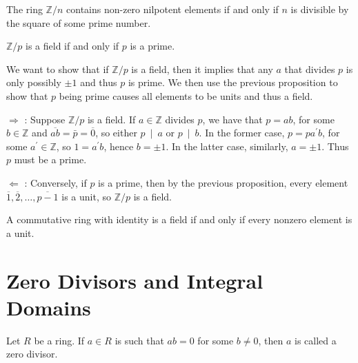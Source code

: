 \begin{lemma}
  The ring \(\mathbb{Z} / n\) contains non-zero nilpotent elements if and only if \(n\) is divisible by the square of some prime number.
\end{lemma}

\begin{corollary}
  \(\mathbb{Z} / p\) is a field if and only if \(p\) is a prime.
\end{corollary}

\begin{proofidea}
  
  We want to show that if \(\mathbb{Z}/p\) is a field, then it implies that any \(a\) that divides \(p\) is only possibly \(\pm 1\) and thus \(p\) is prime. We then use the previous proposition to show that \(p\) being prime causes all elements to be units and thus a field.

\end{proofidea}
  
\begin{formalproof}
  
\(\Rightarrow\) : Suppose \(\mathbb{Z} / p\) is a field. If \(a \in \mathbb{Z}\) divides \(p\), we have that \(p=a b\), for some \(b \in \mathbb{Z}\) and \(\overline{a b}=\bar{p}=\overline{0}\), so either \(p ~ \mid ~ a\) or \(p ~ \mid ~ b\). In the former case, \(p=p a^{\prime} b\), for some \(a^{\prime} \in \mathbb{Z}\), so \(1=a^{\prime} b\), hence \(b= \pm 1\). In the latter case, similarly, \(a= \pm 1\). Thus \(p\) must be a prime.

\(\Leftarrow\) : Conversely, if \(p\) is a prime, then by the previous proposition, every element \(\overline{1}, \overline{2}, \ldots, \overline{p-1}\) is a unit, so \(\mathbb{Z} / p\) is a field.

\end{formalproof}

\begin{remark}
A commutative ring with identity is a field if and only if every nonzero element is a unit.
\end{remark}

\section{Zero Divisors and Integral Domains}

\begin{definition}
  Let \(R\) be a ring. If \(a \in R\) is such that \(a b=0\) for some \(b \neq 0\), then \(a\) is called a zero divisor.
\end{definition}


